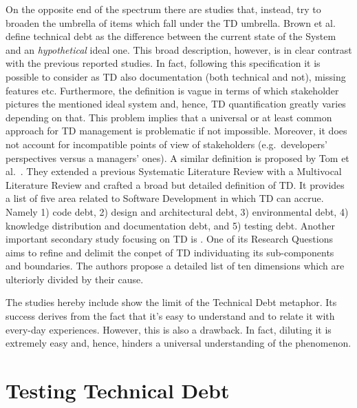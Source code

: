 On the opposite end of the spectrum there are studies that, instead, try to broaden the umbrella of items which fall under the TD umbrella. Brown et al.\ \cite{td_current_vs_optimal_quality} define technical debt as the difference between the current state of the System and an \textit{hypothetical} ideal one. This broad description, however, is in clear contrast with the previous reported studies. In fact, following this specification it is possible to consider as TD also documentation (both technical and not), missing features etc. Furthermore, the definition is vague in terms of which stakeholder pictures the mentioned ideal system and, hence, TD quantification greatly varies depending on that. This problem implies that a universal or at least common approach for TD management is problematic if not impossible. Moreover, it does not account for incompatible points of view of stakeholders (e.g.\ developers' perspectives versus a managers' ones). A similar definition is proposed by Tom et al.\ \cite{exploration_of_td}. They extended a previous Systematic Literature Review \cite{slr,exploration_of_td_2} with a Multivocal Literature Review \cite{multivocal_literature_review} and crafted a broad but detailed definition of TD. It provides a list of five area related to Software Development in which TD can accrue. Namely 1) code debt, 2) design and architectural debt, 3) environmental debt, 4) knowledge distribution and documentation debt, and 5) testing debt. Another important secondary study focusing on TD is \cite{mapping_study_td}. One of its Research Questions aims to refine and delimit the conpet of TD individuating its sub-components and boundaries. The authors propose a detailed list of ten dimensions which are ulteriorly divided by their cause.

The studies hereby include show the limit of the Technical Debt metaphor. Its success derives from the fact that it's easy to understand and to relate it with every-day experiences. However, this is also a drawback. In fact, diluting it is extremely easy and, hence, hinders a universal understanding of the phenomenon.

\section{Testing Technical Debt} \label{testing_td}


